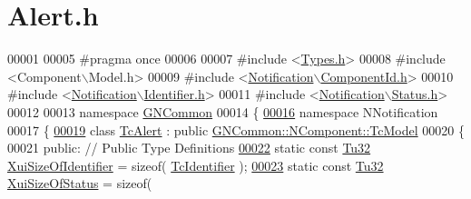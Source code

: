 \hypertarget{_alert_8h_source}{}\section{Alert.\+h}
\label{_alert_8h_source}

\begin{DoxyCode}
00001 
00005 \textcolor{preprocessor}{#pragma once}
00006 
00007 \textcolor{preprocessor}{#include <\mbox{\hyperlink{_types_8h}{Types.h}}>}
00008 \textcolor{preprocessor}{#include <Component\(\backslash\)Model.h>}
00009 \textcolor{preprocessor}{#include <\mbox{\hyperlink{_component_id_8h}{Notification\(\backslash\)ComponentId.h}}>}
00010 \textcolor{preprocessor}{#include <\mbox{\hyperlink{_identifier_8h}{Notification\(\backslash\)Identifier.h}}>}
00011 \textcolor{preprocessor}{#include <\mbox{\hyperlink{_status_8h}{Notification\(\backslash\)Status.h}}>}
00012 
00013 \textcolor{keyword}{namespace }\mbox{\hyperlink{namespace_g_n_common}{GNCommon}}
00014 \{
\mbox{\hyperlink{namespace_g_n_common_1_1_n_notification}{00016}}    \textcolor{keyword}{namespace }NNotification
00017    \{
\mbox{\hyperlink{class_g_n_common_1_1_n_notification_1_1_tc_alert}{00019}}       \textcolor{keyword}{class }\mbox{\hyperlink{class_g_n_common_1_1_n_notification_1_1_tc_alert}{TcAlert}} : \textcolor{keyword}{public} \mbox{\hyperlink{class_g_n_common_1_1_n_component_1_1_tc_model}{GNCommon::NComponent::TcModel}}
00020       \{
00021       \textcolor{keyword}{public}:        \textcolor{comment}{// Public Type Definitions}
\mbox{\hyperlink{class_g_n_common_1_1_n_notification_1_1_tc_alert_a44f63050a2f1c7a4876a31ce2ffd2d06}{00022}}          \textcolor{keyword}{static} \textcolor{keyword}{const} \mbox{\hyperlink{namespace_g_n_common_a941b527ef318f318aed7903dc832b7e4}{Tu32}} \mbox{\hyperlink{class_g_n_common_1_1_n_notification_1_1_tc_alert_a44f63050a2f1c7a4876a31ce2ffd2d06}{XuiSizeOfIdentifier}} = \textcolor{keyword}{sizeof}( 
      \mbox{\hyperlink{class_g_n_common_1_1_n_notification_1_1_tc_identifier}{TcIdentifier}} ); 
\mbox{\hyperlink{class_g_n_common_1_1_n_notification_1_1_tc_alert_a59f856e0a33731ee0c235271bb013a34}{00023}}          \textcolor{keyword}{static} \textcolor{keyword}{const} \mbox{\hyperlink{namespace_g_n_common_a941b527ef318f318aed7903dc832b7e4}{Tu32}} \mbox{\hyperlink{class_g_n_common_1_1_n_notification_1_1_tc_alert_a59f856e0a33731ee0c235271bb013a34}{XuiSizeOfStatus}}     = \textcolor{keyword}{sizeof}( 

\end{DoxyCode}
